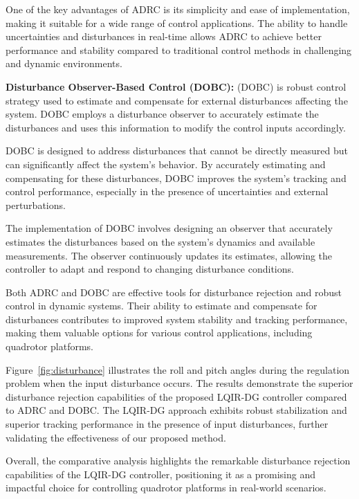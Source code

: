 \documentclass[3p]{elsarticle}
\begin{document}
One of the key advantages of ADRC is its simplicity and ease of implementation, making it suitable for a wide range of control applications. The ability to handle uncertainties and disturbances in real-time allows ADRC to achieve better performance and stability compared to traditional control methods in challenging and dynamic environments.

\textbf{Disturbance Observer-Based Control (DOBC):}
(DOBC) is robust control strategy used to estimate and compensate for external disturbances affecting the system. DOBC employs a disturbance observer to accurately estimate the disturbances and uses this information to modify the control inputs accordingly.

DOBC is designed to address disturbances that cannot be directly measured but can significantly affect the system's behavior. By accurately estimating and compensating for these disturbances, DOBC improves the system's tracking and control performance, especially in the presence of uncertainties and external perturbations.

The implementation of DOBC involves designing an observer that accurately estimates the disturbances based on the system's dynamics and available measurements. The observer continuously updates its estimates, allowing the controller to adapt and respond to changing disturbance conditions.

Both ADRC and DOBC are effective tools for disturbance rejection and robust control in dynamic systems. Their ability to estimate and compensate for disturbances contributes to improved system stability and tracking performance, making them valuable options for various control applications, including quadrotor platforms.

Figure~\ref{fig:disturbance} illustrates the roll and pitch angles during the regulation problem when the input disturbance occurs. The results demonstrate the superior disturbance rejection capabilities of the proposed LQIR-DG controller compared to ADRC and DOBC. The LQIR-DG approach exhibits robust stabilization and superior tracking performance in the presence of input disturbances, further validating the effectiveness of our proposed method.

Overall, the comparative analysis highlights the remarkable disturbance rejection capabilities of the LQIR-DG controller, positioning it as a promising and impactful choice for controlling quadrotor platforms in real-world scenarios.
\end{document}
